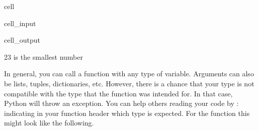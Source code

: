 \documentclass[letterpaper,10pt,english]{jupyterBook}
\begin{document}
\begin{sphinxuseclass}{cell}\begin{sphinxVerbatimInput}

\begin{sphinxuseclass}{cell_input}
\begin{sphinxVerbatim}[commandchars=\\\{\}]
           
\end{sphinxVerbatim}

\end{sphinxuseclass}\end{sphinxVerbatimInput}
\begin{sphinxVerbatimOutput}

\begin{sphinxuseclass}{cell_output}
\begin{sphinxVerbatim}[commandchars=\\\{\}]
23 is the smallest number
\end{sphinxVerbatim}

\end{sphinxuseclass}\end{sphinxVerbatimOutput}

\end{sphinxuseclass}
\sphinxAtStartPar
In general, you can call a function with any type of variable. Arguments can also be lists, tuples, dictionaries, etc. However, there is a chance that your type is not compatible with the type that the function was intended for. In that case, Python will throw an exception. You can help others reading your code by : indicating in your function header which type is expected. For the  function this might look like the following.
\end{document}
